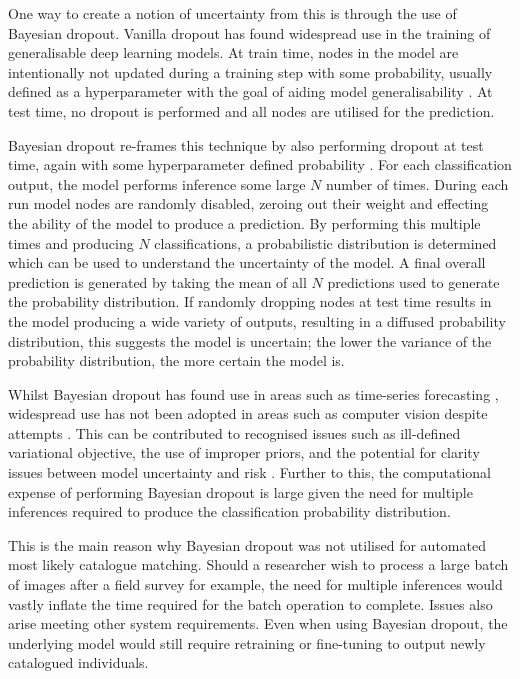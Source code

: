 One way to create a notion of uncertainty from this is through the use of Bayesian dropout. Vanilla dropout has found widespread use in the training of generalisable deep learning models. At train time, nodes in the model are intentionally not updated during a training step with some probability, usually defined as a hyperparameter with the goal of aiding model generalisability \cite{srivastava_dropout:_2014}. At test time, no dropout is performed and all nodes are utilised for the prediction. 

Bayesian dropout re-frames this technique by also performing dropout at test time, again with some hyperparameter defined probability \cite{gal_dropout_2016}. For each classification output, the model performs inference some large $N$ number of times. During each run model nodes are randomly disabled, zeroing out their weight and effecting the ability of the model to produce a prediction. By performing this multiple times and producing $N$ classifications, a probabilistic distribution is determined which can be used to understand the uncertainty of the model. A final overall prediction is generated by taking the mean of all $N$ predictions used to generate the probability distribution. If randomly dropping nodes at test time results in the model producing a wide variety of outputs, resulting in a diffused probability distribution, this suggests the model is uncertain; the lower the variance of the probability distribution, the more certain the model is. 

Whilst Bayesian dropout has found use in areas such as time-series forecasting \cite{laptev_time-series_2017}, widespread use has not been adopted in areas such as computer vision despite attempts \cite{kendall_what_2017}. This can be contributed to recognised issues such as ill-defined variational objective, the use of improper priors, and the potential for clarity issues between model uncertainty and risk \cite{hron_variational_2018, osband_risk_2016}. Further to this, the computational expense of performing Bayesian dropout is large given the need for multiple inferences required to produce the classification probability distribution.

This is the main reason why Bayesian dropout was not utilised for automated most likely catalogue matching. Should a researcher wish to process a large batch of images after a field survey for example, the need for multiple inferences would vastly inflate the time required for the batch operation to complete. Issues also arise meeting other system requirements. Even when using Bayesian dropout, the underlying model would still require retraining or fine-tuning to output newly catalogued individuals. 

